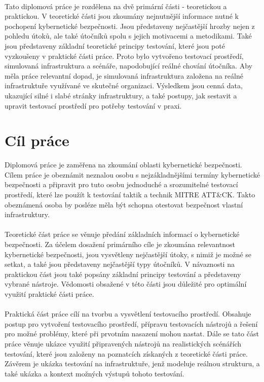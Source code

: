 \paragraph{}
Tato diplomová práce je rozdělena na dvě primární části - teoretickou a praktickou.
V teoretické části jsou zkoumány nejnutnější informace nutné k pochopení kybernetické bezpečnosti.
Jsou představeny nejčastější hrozby nejen z pohledu útoků, ale také útočníků spolu s jejich motivacemi a metodikami.
Také jsou představeny základní teoretické principy testování, které jsou poté vyzkoušeny v praktické části práce.
Proto bylo vytvořeno testovací prostředí, simulovaná infrastruktura a scénáře, napodobující reálné chování útočníka.
Aby měla práce relevantní dopad, je simulovaná infrastruktura založena na reálné infrastruktuře využívané ve skutečné organizaci.
Výsledkem jsou cenná data, ukazující silné i slabé stránky infrastruktury, a také postupy, jak sestavit a upravit testovací prostředí pro potřeby testování v praxi.




\section{Cíl práce}\label{sec:cil-prace}
Diplomová práce je zaměřena na zkoumání oblasti kybernetické bezpečnosti.
Cílem práce je obeznámit neznalou osobu s nejzákladnějšími termíny kybernetické bezpečnosti a připravit pro tuto osobu jednoduché a srozumitelné testovací prostředí, které lze použít k testování taktik a technik MITRE ATT\&CK\@.
Takto obeznámená osoba by posléze měla být schopna otestovat bezpečnost vlastní infrastruktury.

\paragraph{}
Teoretické část práce se věnuje předání základních informací o kybernetické bezpečnosti.
Za účelem dosažení primárního cíle je zkoumána relevantnost kybernetické bezpečnosti, jsou vysvětleny nejčastější útoky, s nimiž je možné se setkat, a také jsou představeny nejčastější typy útočníků.
V návaznosti na praktickou část jsou také popsány základní principy testování a představeny vybrané nástroje.
Vědomosti obsažené v této části jsou důležité pro optimální využití praktické části práce.

\paragraph{}
Praktická část práce cílí na tvorbu a vysvětlení testovacího prostředí.
Obsahuje postup pro vytvoření testovacího prostředí, přípravu testovacích nástrojů a řešení pro možné problémy, které při prvotním nasazení mohou nastat.
Dále se tato část práce věnuje ukázce využití připravených nástrojů na realistických scénářích testování, které jsou založeny na poznatcích získaných z teoretické části práce.
Závěrem je ukázka testování na infrastruktuře, jenž modeluje reálnou strukturu, a také ukázka a kontext možných výstupů tohoto testování.



